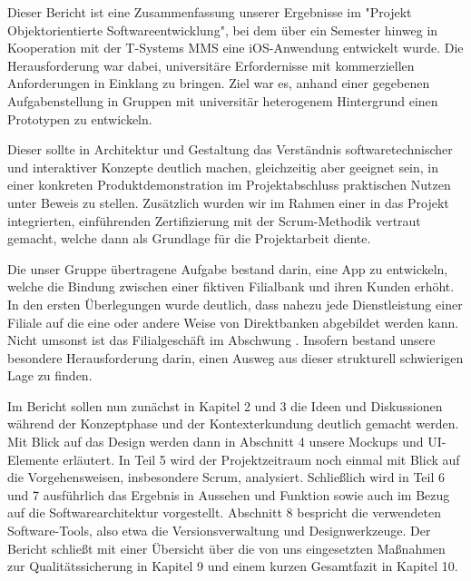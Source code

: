 	Dieser Bericht ist eine Zusammenfassung unserer Ergebnisse im "Projekt Objektorientierte Softwareentwicklung", bei dem über ein Semester hinweg in Kooperation mit der T-Systems MMS eine iOS-Anwendung entwickelt wurde. Die Herausforderung war dabei, universitäre Erfordernisse mit kommerziellen Anforderungen in Einklang zu bringen. Ziel war es, anhand einer gegebenen Aufgabenstellung in Gruppen mit universitär heterogenem Hintergrund einen Prototypen zu entwickeln.
	
	Dieser sollte in Architektur und Gestaltung das Verständnis softwaretechnischer und interaktiver Konzepte deutlich machen, gleichzeitig aber geeignet sein, in einer konkreten Produktdemonstration im Projektabschluss praktischen Nutzen unter Beweis zu stellen. Zusätzlich wurden wir im Rahmen einer in das Projekt integrierten, einführenden Zertifizierung mit der Scrum-Methodik vertraut gemacht, welche dann als Grundlage für die Projektarbeit diente. 

	Die unser Gruppe übertragene Aufgabe bestand darin, eine App zu entwickeln, welche die Bindung zwischen einer fiktiven Filialbank und ihren Kunden erhöht. In den ersten Überlegungen wurde deutlich, dass nahezu jede Dienstleistung einer Filiale auf die eine oder andere Weise von Direktbanken abgebildet werden kann. Nicht umsonst ist das Filialgeschäft im Abschwung \citep{Welt14}. Insofern bestand unsere besondere Herausforderung darin, einen Ausweg aus dieser strukturell schwierigen Lage zu finden.
	
	Im Bericht sollen nun zunächst in Kapitel 2 und 3 die Ideen und Diskussionen während der Konzeptphase und der Kontexterkundung deutlich gemacht werden. Mit Blick auf das Design werden dann in Abschnitt 4 unsere Mockups und UI-Elemente erläutert. In Teil 5 wird der Projektzeitraum noch einmal mit Blick auf die Vorgehensweisen, insbesondere Scrum, analysiert. Schließlich wird in Teil 6 und 7 ausführlich das Ergebnis in Aussehen und Funktion sowie auch im Bezug auf die Softwarearchitektur vorgestellt. Abschnitt 8 bespricht die verwendeten Software-Tools, also etwa die Versionsverwaltung und Designwerkzeuge. Der Bericht schließt mit einer Übersicht über die von uns eingesetzten Maßnahmen zur Qualitätssicherung in Kapitel 9 und einem kurzen Gesamtfazit in Kapitel 10.
	 